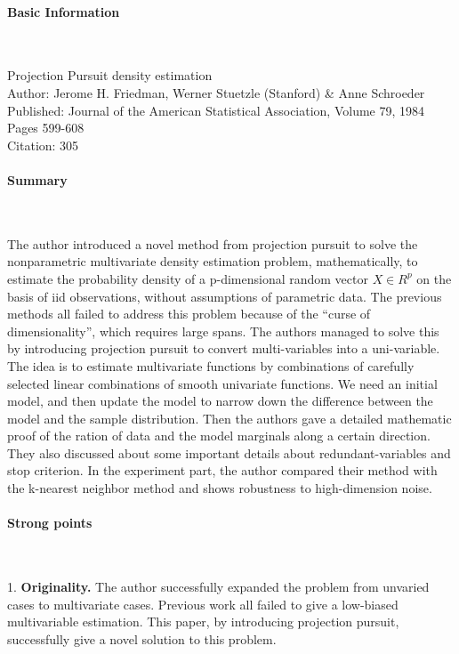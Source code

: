 \documentclass{article}
\begin{document}
\thispagestyle{empty}

\paragraph{Basic Information}  \  

Projection Pursuit density estimation\\
Author: Jerome H. Friedman, Werner Stuetzle (Stanford) \& Anne Schroeder\\
Published: Journal of the American Statistical Association, Volume 79, 1984 Pages 599-608\\
Citation: 305

\paragraph{Summary}  \  

The author introduced a novel method from projection pursuit to solve the nonparametric multivariate density estimation problem, mathematically, to estimate the probability density of  a p-dimensional random vector $X \in R^p$ on the basis of iid observations, without assumptions of parametric data. The previous methods all failed to address this problem because of the “curse of dimensionality”, which requires large spans. The authors managed to solve this by introducing projection pursuit to convert multi-variables into a uni-variable. The idea is to estimate multivariate functions by combinations of carefully selected linear combinations of smooth univariate functions. We need an initial model, and then update the model to narrow down the difference between the model and the sample distribution. Then the authors gave a detailed mathematic proof of the ration of data and the model marginals along a certain direction. They also discussed about some important details about redundant-variables and stop criterion. In the experiment part, the author compared their method with the k-nearest neighbor method and shows robustness to high-dimension noise.

\paragraph{Strong points}  \  

1. \textbf{Originality.} The author successfully expanded the problem from unvaried cases to multivariate cases. Previous work all failed to give a low-biased multivariable estimation. This paper, by introducing projection pursuit, successfully give a novel solution to this problem.
 
\end{document}
